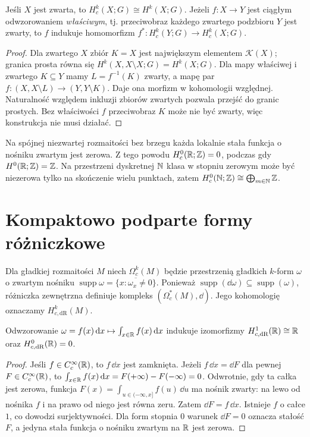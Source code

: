 \begin{stwierdzenie}
\label{prop:compact-proper-v11}
Jeśli $X$ jest zwarta, to $H_c^k(X;G)\cong H^k(X;G)$.
Jeżeli $f:X\to Y$ jest ciągłym odwzorowaniem \emph{właściwym},
tj. przeciwobraz każdego zwartego podzbioru $Y$ jest zwarty,
to $f$ indukuje homomorfizm
$f^*:H_c^k(Y;G)\to H_c^k(X;G)$.
\end{stwierdzenie}
\begin{proof}
Dla zwartego $X$ zbiór $K=X$ jest największym elementem
$\mathcal K(X)$; granica prosta równa się
$H^k(X,X\setminus X;G)=H^k(X;G)$.
Dla mapy właściwej i zwartego $K\subseteq Y$ mamy
$L=f^{-1}(K)$ zwarty, a mapę par
$f:(X,X\setminus L)\to(Y,Y\setminus K)$.
Daje ona morfizm w kohomologii względnej. Naturalność
względem inkluzji zbiorów zwartych pozwala przejść
do granic prostych. Bez właściwości $f$ przeciwobraz
$K$ może nie być zwarty, więc konstrukcja nie musi działać.
\end{proof}

\begin{przyklad}[Dlaczego $H_c^0(\R)=0$?]
Na spójnej niezwartej rozmaitości bez brzegu
każda lokalnie stała funkcja o nośniku zwartym jest zerowa.
Z tego powodu $H_c^0(\mathbb{R};\mathbb{Z})=0$, podczas gdy
$H^0(\mathbb{R};\mathbb{Z})=\mathbb{Z}$. Na przestrzeni dyskretnej $\mathbb{N}$
klasa w stopniu zerowym może być niezerowa tylko na
skończenie wielu punktach, zatem
$H_c^0(\mathbb{N};\mathbb{Z})\cong\bigoplus_{m\in\mathbb{N}}\mathbb{Z}$.
\end{przyklad}

\section{Kompaktowo podparte formy różniczkowe}
\begin{definicja}
Dla gładkiej rozmaitości $M$ niech $\Omega_c^k(M)$ będzie
przestrzenią gładkich $k$-form $\omega$ o zwartym nośniku
$\operatorname{supp}\omega=\overline{\{x:\omega_x\ne0\}}$.
Ponieważ $\operatorname{supp}(\dd\omega)\subseteq
\operatorname{supp}(\omega)$, różniczka zewnętrzna definiuje
kompleks $(\Omega_c^*(M),\dd)$. Jego kohomologię oznaczamy
$H_{c,\mathrm{dR}}^k(M)$.
\end{definicja}

\begin{lemat}
\label{lem:compact-R-v11}
Odwzorowanie $\omega=f(x)\,\mathrm d x\mapsto
\int_{x\in\mathbb{R}}f(x)\,\mathrm d x$ indukuje izomorfizmy
$H_{c,\mathrm{dR}}^1(\mathbb{R})\cong\mathbb{R}$ oraz
$H_{c,\mathrm{dR}}^0(\mathbb{R})=0$.
\end{lemat}
\begin{proof}
Jeśli $f\in C_c^\infty(\mathbb{R})$, to $f\,\dd x$ jest zamknięta.
Jeżeli $f\,\dd x=\dd F$ dla pewnej
$F\in C_c^\infty(\mathbb{R})$, to
$\int_{x\in\mathbb{R}}f(x)\,\mathrm d x=F(+\infty)-F(-\infty)=0$.
Odwrotnie, gdy ta całka jest zerowa, funkcja
$F(x)=\int_{u\in(-\infty,x]} f(u)\,\dd u$ ma nośnik
zwarty: na lewo od nośnika $f$ i na prawo od niego
jest równa zeru. Zatem $\dd F=f\,\dd x$.
Istnieje $f$ o całce $1$, co dowodzi surjektywności.
Dla form stopnia $0$ warunek $\dd F=0$ oznacza
stałość $F$, a jedyna stała funkcja o nośniku zwartym
na $\mathbb{R}$ jest zerowa.
\end{proof}

